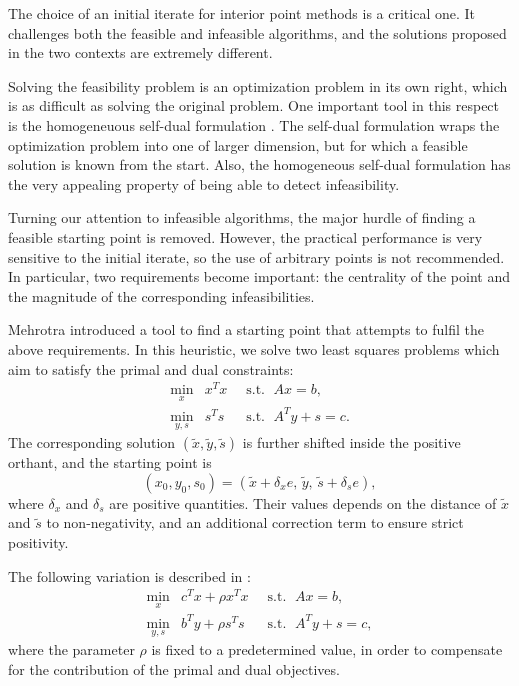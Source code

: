 The choice of an initial iterate for interior point methods is a
critical one. It challenges both the feasible and infeasible
algorithms, and the solutions proposed in the two contexts are
extremely different.

Solving the feasibility problem is an optimization problem in its
own right, which is as difficult as solving the original problem.
One important tool in this respect is the 
homogeneuous self-dual formulation \cite[ch.~9]{ipm:Wright97}.
The self-dual formulation wraps the optimization problem into one 
of larger dimension, but for which a feasible solution is known 
from the start.
Also, the homogeneous self-dual formulation has the very
appealing property of being able to detect infeasibility.


Turning our attention to infeasible algorithms, the major hurdle
of finding a feasible starting point is removed. 
However, the practical performance is very sensitive to the initial
iterate, so the use of arbitrary points is not recommended.
In particular, two requirements become important: the centrality 
of the point and the magnitude of the corresponding infeasibilities.

Mehrotra \cite{Mehrotra92} introduced a tool to find a starting point 
that attempts to fulfil the above requirements. In this
heuristic, we solve two least squares problems which aim to
satisfy the primal and dual constraints:
\begin{eqnarray*}
  \min_x    \!\! & x^Tx & \;\;\mbox{s.t. }\; Ax = b,      \\
  \min_{y,s}\!\! & s^Ts & \;\;\mbox{s.t. }\; A^Ty + s = c.
\end{eqnarray*}
The corresponding solution $(\tilde x, \tilde y, \tilde s)$ is further 
shifted inside the positive orthant, and the starting point is
\[
(x_0,y_0,s_0) = (\tilde x + \delta_x e,\, \tilde y,\, \tilde s + \delta_s e),
\]
where $\delta_x$ and $\delta_s$ are positive quantities. 
Their values depends on the distance of $\tilde x$ and $\tilde s$
to non-negativity, and an additional correction term to ensure
strict positivity.

The following variation is described in \cite{GondzioTerlaky}:
\begin{eqnarray*} 
  \min_x    \!\! & c^Tx + \rho x^Tx & \;\;\mbox{s.t. }\; Ax = b,      \\
  \min_{y,s}\!\! & b^Ty + \rho s^Ts & \;\;\mbox{s.t. }\; A^Ty + s = c,
\end{eqnarray*}
where the parameter $\rho$ is fixed to a predetermined value, in order
to compensate for the contribution of the primal and dual objectives.

